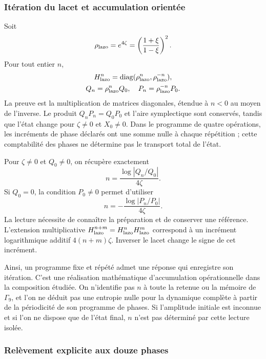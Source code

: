 \subsubsection{Itération du lacet et accumulation orientée}
\label{md:comp:iteracion}

Soit
\[
 \rho_{\rm lazo}=e^{4\zeta}
 =\left(\frac{1+\xi}{1-\xi}\right)^2.
\]
Pour tout entier \(n\),
\begin{equation}
 \begin{gathered}
 H_{\rm lazo}^n
 =\operatorname{diag}(\rho_{\rm lazo}^{n},\rho_{\rm lazo}^{-n}),
 \\
 Q_n=\rho_{\rm lazo}^{n}Q_0,\quad
 P_n=\rho_{\rm lazo}^{-n}P_0.
 \end{gathered}
 \label{md:comp:iteracion-diagonal}
\end{equation}
La preuve est la multiplication de matrices diagonales, étendue à
\(n<0\) au moyen de l’inverse. Le produit
\(Q_nP_n=Q_0P_0\) et l’aire symplectique sont conservés, tandis que l’état change
pour \(\zeta\ne0\) et \(X_0\ne0\). Dans le programme de quatre
opérations, les incréments de phase déclarés ont une somme nulle à chaque
répétition ; cette comptabilité des phases ne détermine pas le transport
total de l’état.

Pour \(\zeta\ne0\) et \(Q_0\ne0\), on récupère exactement
\[
 n=\frac{\log|Q_n/Q_0|}{4\zeta}.
\]
Si \(Q_0=0\), la condition \(P_0\ne0\) permet d’utiliser
\[
 n=-\frac{\log|P_n/P_0|}{4\zeta}.
\]
La lecture nécessite de connaître la préparation et de conserver une référence.
L’extension multiplicative
\(H_{\rm lazo}^{n+m}=H_{\rm lazo}^{n}H_{\rm lazo}^{m}\)
correspond à un incrément logarithmique additif \(4(n+m)\zeta\).
Inverser le lacet change le signe de cet incrément.

Ainsi, un programme fixe et répété admet une réponse qui enregistre
son itération. C’est une réalisation mathématique d’accumulation
opérationnelle dans la composition étudiée. On n’identifie pas \(n\)
à toute la retenue ou la mémoire de \(\Gamma_9\), et l’on ne déduit pas une
entropie nulle pour la dynamique complète à partir de la périodicité
de son programme de phases. Si l’amplitude initiale est inconnue et
si l’on ne dispose que de l’état final, \(n\) n’est pas déterminé par
cette lecture isolée.

\subsubsection{Relèvement explicite aux douze phases}
\label{md:comp:levantamiento}

